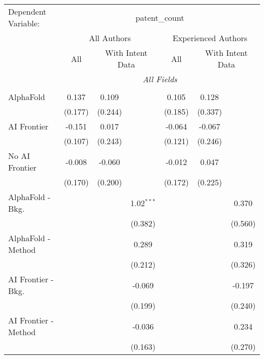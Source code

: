 \begingroup
\centering
\begin{tabular}{lcccccc}
   \tabularnewline \midrule \midrule
   Dependent Variable: & \multicolumn{6}{c}{patent\_count}\\
 & \multicolumn{3}{c}{All Authors} & \multicolumn{3}{c}{Experienced Authors} \\
\cmidrule(lr){2-4} \cmidrule(lr){5-7}
 & \multicolumn{1}{c}{All} & \multicolumn{2}{c}{With Intent Data} & \multicolumn{1}{c}{All} & \multicolumn{2}{c}{With Intent Data} \\
\cmidrule(lr){2-2} \cmidrule(lr){3-4} \cmidrule(lr){5-5} \cmidrule(lr){6-7}
 & \multicolumn{6}{c}{\textit{All Fields}} \\ \\
   AlphaFold               & 0.137   & 0.109   &              & 0.105   & 0.128   &   \\   
                           & (0.177) & (0.244) &              & (0.185) & (0.337) &   \\   
   AI Frontier             & -0.151  & 0.017   &              & -0.064  & -0.067  &   \\   
                           & (0.107) & (0.243) &              & (0.121) & (0.246) &   \\   
   No AI Frontier          & -0.008  & -0.060  &              & -0.012  & 0.047   &   \\   
                           & (0.170) & (0.200) &              & (0.172) & (0.225) &   \\   
   AlphaFold - Bkg.        &         &         & 1.02$^{***}$ &         &         & 0.370\\   
                           &         &         & (0.382)      &         &         & (0.560)\\   
   AlphaFold - Method      &         &         & 0.289        &         &         & 0.319\\   
                           &         &         & (0.212)      &         &         & (0.326)\\   
   AI Frontier - Bkg.      &         &         & -0.069       &         &         & -0.197\\   
                           &         &         & (0.199)      &         &         & (0.240)\\   
   AI Frontier - Method    &         &         & -0.036       &         &         & 0.234\\   
                           &         &         & (0.163)      &         &         & (0.270)\\   

\end{tabular}
